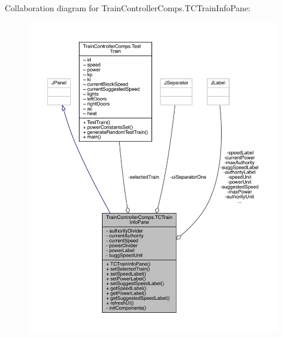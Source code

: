 Collaboration diagram for Train\+Controller\+Comps.\+T\+C\+Train\+Info\+Pane\+:
\nopagebreak
\begin{figure}[H]
\begin{center}
\leavevmode
\includegraphics[width=350pt]{classTrainControllerComps_1_1TCTrainInfoPane__coll__graph}
\end{center}
\end{figure}
